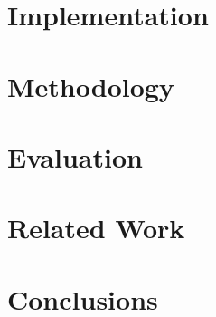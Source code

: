 \documentclass[format=acmsmall, review=false, screen=true]{acmart}
\begin{document}
\section{Implementation}
\label{sec:implementation}




%

\section{Methodology}
\label{sec:methodology}



\section{Evaluation}
\label{sec:evaluation}



\section{Related Work}
\label{sec:related_work}



\section{Conclusions}
\label{sec:conclusions}





\end{document}
